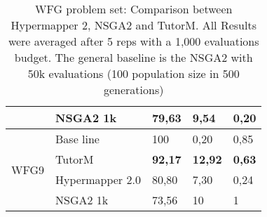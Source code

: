 \begin{table}[]
{\begin{tabular}{@{}lllll@{}}
                          & NSGA2 1k        & 79,63          & 9,54           & 0,20          \\ \midrule
    \multirow{4}{*}{WFG9} & Base line       & 100            & 0,20           & 0,85          \\ \cmidrule(l){2-5} 
                          & TutorM          & \textbf{92,17} & \textbf{12,92} & \textbf{0,63} \\ \cmidrule(l){2-5} 
                          & Hypermapper 2.0 & 80,80          & 7,30           & 0,24          \\ \cmidrule(l){2-5} 
                          & NSGA2 1k        & 73,56          & 10             & 1             \\ \bottomrule
    \end{tabular}%
    }
    \caption{WFG problem set: Comparison between Hypermapper 2, NSGA2 and TutorM.  All Results were averaged after 5 reps with a 1,000 evaluations budget.
    The general baseline is the NSGA2 with 50k evaluations (100 population size in 500 generations)}
    \label{tab:wfg_summary}
    \end{table}